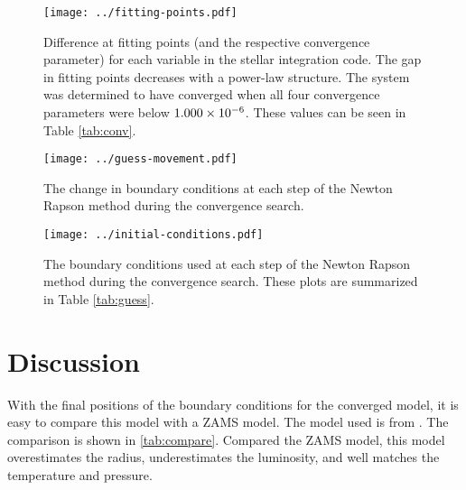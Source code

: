 \documentclass[12pt]{article}
\begin{document}
\begin{table}[htbp]
\begin{center}
\label{tab:conv}

 \end{center}
 \end{table}
 
 \begin{figure}[htbp]
    \centering
    \texttt{[image: ../fitting-points.pdf]}
    \caption[Gaps at Fitting Points]{Difference at fitting points (and the respective convergence parameter) for each variable in the stellar integration code. The gap in fitting points decreases with a power-law structure. The system was determined to have converged when all four convergence parameters were below $1.000 \times 10^{-6}$. These values can be seen in Table \ref{tab:conv}.}
    \label{fig:conv}
 \end{figure}
 
  \begin{figure}[htbp]
    \centering
    \texttt{[image: ../guess-movement.pdf]}
    \caption[Boundary Point Movement]{The change in boundary conditions at each step of the Newton Rapson method during the convergence search.}
    \label{fig:boundarydelta}
 \end{figure}
 \begin{figure}[htbp]
    \centering
    \texttt{[image: ../initial-conditions.pdf]}
    \caption[Boundary Points]{The boundary conditions used at each step of the Newton Rapson method during the convergence search. These plots are summarized in Table \ref{tab:guess}.}
    \label{fig:boundary}
 \end{figure}    


\section{Discussion} \label{sec:discussion}
With the final positions of the boundary conditions for the converged model, it is easy to compare this model with a ZAMS model. The model used is from \citet{hansen2004stellar}. The comparison is shown in \cref{tab:compare}. Compared the ZAMS model, this model overestimates the radius, underestimates the luminosity, and well matches the temperature and pressure.
\end{document}
